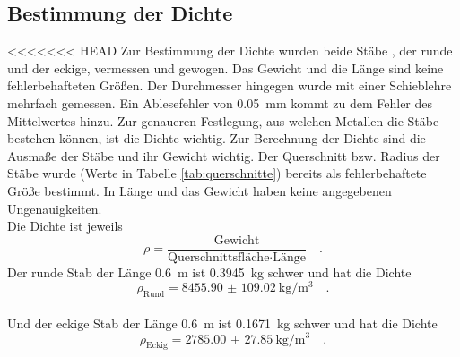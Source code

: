 \subsection{Bestimmung der Dichte}
<<<<<<< HEAD
Zur Bestimmung der Dichte wurden beide Stäbe , der runde und der eckige, vermessen und gewogen. Das Gewicht und die Länge sind keine fehlerbehafteten Größen. Der Durchmesser hingegen wurde mit einer Schieblehre mehrfach gemessen. Ein Ablesefehler von \SI{0.05}{\milli\metre}  kommt zu dem Fehler des Mittelwertes hinzu.
Zur genaueren Festlegung, aus welchen Metallen die Stäbe bestehen können, ist die Dichte wichtig. Zur Berechnung der Dichte sind die Ausmaße der Stäbe und ihr Gewicht wichtig.
Der Querschnitt bzw. Radius der Stäbe wurde (Werte in Tabelle \ref{tab:querschnitte}) bereits als fehlerbehaftete Größe bestimmt. In Länge und das Gewicht haben keine angegebenen Ungenauigkeiten. \\
Die Dichte ist jeweils
\begin{equation}
  \rho = \frac{\text{Gewicht}}{\text{Querschnittsfläche} \cdot \text{Länge}} \quad.
\end{equation}
Der runde Stab der Länge \SI{0.6}{\metre} ist \SI{0.3945}{\kilo\gram} schwer und hat die Dichte
\begin{equation}
  \rho_\text{Rund} = \SI{8455.90(10902)}{\kilo\gram\per\cubic\metre} \quad.
\end{equation}  \\
Und der eckige Stab der Länge \SI{0.6}{\metre} ist \SI{0.1671}{\kilo\gram} schwer und hat die Dichte
\begin{equation}
  \rho_\text{Eckig} = \SI{2785.00(2785)}{\kilo\gram\per\cubic\metre} \quad.
\end{equation}
